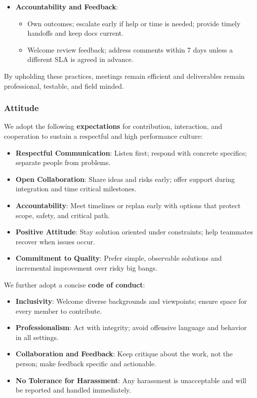 \documentclass{article}
\begin{document}
\begin{itemize}
  \item \textbf{Accountability and Feedback}:
        \begin{itemize}
          \item Own outcomes; escalate early if help or time is needed; provide timely handoffs
                and keep docs current.
          \item Welcome review feedback; address comments within 7 days unless a different SLA
                is agreed in advance.
        \end{itemize}

\end{itemize}

\noindent
By upholding these practices, meetings remain efficient and deliverables remain
professional, testable, and field minded.

\subsubsection*{\color{blue}Attitude}

We adopt the following \textbf{expectations} for contribution, interaction, and
cooperation to sustain a respectful and high performance culture:

\begin{itemize}
  \item \textbf{Respectful Communication}: Listen first; respond with concrete
        specifics; separate people from problems.
  \item \textbf{Open Collaboration}: Share ideas and risks early; offer support
        during integration and time critical milestones.
  \item \textbf{Accountability}: Meet timelines or replan early with options
        that protect scope, safety, and critical path.
  \item \textbf{Positive Attitude}: Stay solution oriented under constraints;
        help teammates recover when issues occur.
  \item \textbf{Commitment to Quality}: Prefer simple, observable solutions and
        incremental improvement over risky big bangs.
\end{itemize}

\noindent
We further adopt a concise \textbf{code of conduct}:

\begin{itemize}
  \item \textbf{Inclusivity}: Welcome diverse backgrounds and viewpoints; ensure
        space for every member to contribute.
  \item \textbf{Professionalism}: Act with integrity; avoid offensive language
        and behavior in all settings.
  \item \textbf{Collaboration and Feedback}: Keep critique about the work, not
        the person; make feedback specific and actionable.
  \item \textbf{No Tolerance for Harassment}: Any harassment is unacceptable
        and will be reported and handled immediately.
\end{itemize}
\end{document}
